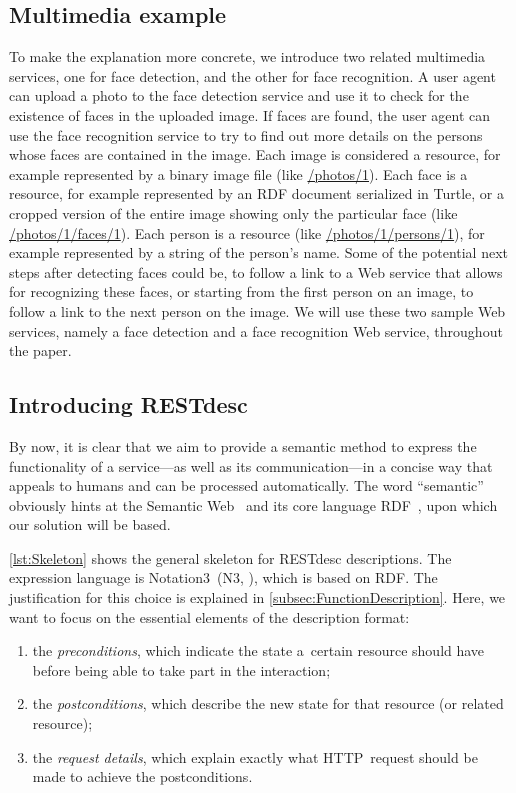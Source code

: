 \documentclass[smallextended]{svjour3}
\begin{document}
{\subsection{Multimedia example}
To make the explanation more concrete, we introduce two related multimedia services, one for face detection, and the other for face recognition. A user agent can upload a photo to the face detection service and use it to check for the existence of faces in the uploaded image. If faces are found, the user agent can use the face recognition service to try to find out more details on the persons whose faces are contained in the image. Each image is considered a resource, for example represented by a binary image file (like \url{/photos/1}). Each face is a resource, for example represented by an RDF document serialized in Turtle, or a cropped version of the entire image showing only the particular face (like \url{/photos/1/faces/1}). Each person is a resource (like \url{/photos/1/persons/1}), for example represented by a string of the person's name. Some of the potential next steps after detecting faces could be, to follow a link to a Web service that allows for recognizing these faces, or starting from the first person on an image, to follow a link to the next person on the image. We will use these two sample Web services, namely a face detection and a face recognition Web service, throughout the paper.

\subsection{Introducing RESTdesc}
By now, it is clear that we aim to provide a semantic method to express the functionality of a service---as well as its communication---in a concise way that appeals to humans and can be processed automatically. The word ``semantic'' obviously hints at the Semantic Web~\cite{SemanticWeb} and its core language RDF~\cite{RDF}, upon which our solution will be based.

\autoref{lst:Skeleton} shows the general skeleton for RESTdesc descriptions.
The expression language is Notation3~(N3, \cite{Notation3}), which is based on RDF.
The justification for this choice is explained in \autoref{subsec:FunctionDescription}.
Here, we want to focus on the essential elements of the description format:
\begin{enumerate}
\item the \emph{preconditions}, which indicate the state a~certain resource should have before being able to take part in the interaction;
\item the \emph{postconditions}, which describe the new state for that resource (or related resource);
\item the \emph{request details}, which explain exactly what HTTP~request should be made to achieve the postconditions.
\end{enumerate}

}
\end{document}
